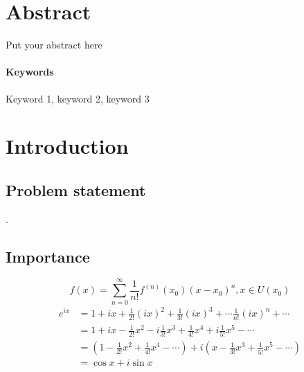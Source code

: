 \documentclass{senior-design}
\begin{document}
\setcounter{page}{1}
\generalreportcover %

\section*{Abstract}
Put your abstract here

\paragraph{Keywords}
Keyword 1, keyword 2, keyword 3
\clearpage
\tableofcontents
\clearpage

\setcounter{page}{1}
\section{Introduction}
\subsection{Problem statement}
\lipsum[1]\cite{li1999,haynes1951}.
\subsection{Importance}
\begin{equation}
    f\left( x \right) =\sum_{n=0}^{\infty}{\frac{1}{n!}f^{\left( n \right)}\left( x_0 \right) \left( x-x_0 \right) ^n}, x\in U\left( x_0 \right)
\end{equation}
\begin{equation}
    \begin{aligned}
    e^{ix}&=1+ix+\frac{1}{2!}\left( ix \right) ^2+\frac{1}{3!}\left( ix \right) ^3+\cdots \frac{1}{n!}\left( ix \right) ^n+\cdots
    \\
    &=1+ix-\frac{1}{2!}x^2-i\frac{1}{3!}x^3+\frac{1}{4!}x^4+i\frac{1}{5!}x^5-\cdots
    \\
    &=\left( 1-\frac{1}{2!}x^2+\frac{1}{4!}x^4-\cdots \right) +i\left( x-\frac{1}{3!}x^3+\frac{1}{5!}x^5-\cdots \right)
    \\
    &=\cos x+i\sin x
    \end{aligned}
\end{equation}
\end{document}
